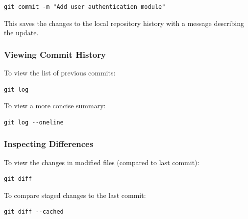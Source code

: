 \documentclass{article}
\begin{document}
\begin{tcolorbox}[colback=mintgreen, colframe=green!40!black, boxrule=0.5pt, sharp corners]
\begin{verbatim}
git commit -m "Add user authentication module"
\end{verbatim}
\end{tcolorbox}

\noindent This saves the changes to the local repository history with a message describing the update.

\subsubsection{Viewing Commit History}

To view the list of previous commits:

\begin{tcolorbox}[colback=mintgreen, colframe=green!40!black, boxrule=0.5pt, sharp corners]
\begin{verbatim}
git log
\end{verbatim}
\end{tcolorbox}

\noindent To view a more concise summary:

\begin{tcolorbox}[colback=mintgreen, colframe=green!40!black, boxrule=0.5pt, sharp corners]
\begin{verbatim}
git log --oneline
\end{verbatim}
\end{tcolorbox}

\subsubsection{Inspecting Differences}

To view the changes in modified files (compared to last commit):

\begin{tcolorbox}[colback=mintgreen, colframe=green!40!black, boxrule=0.5pt, sharp corners]
\begin{verbatim}
git diff
\end{verbatim}
\end{tcolorbox}

\noindent To compare staged changes to the last commit:

\begin{tcolorbox}[colback=mintgreen, colframe=green!40!black, boxrule=0.5pt, sharp corners]
\begin{verbatim}
git diff --cached
\end{verbatim}
\end{tcolorbox}
\end{document}
